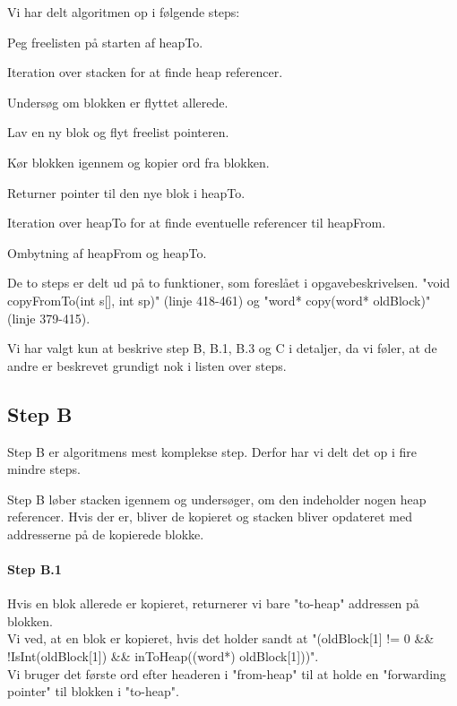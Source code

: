 Vi har delt algoritmen op i følgende steps:
\begin{my_description}
\item[Step A] Peg freelisten på starten af heapTo.
\item[Step B] Iteration over stacken for at finde heap referencer.
	\begin{my_description}
	\item[Step B.1] Undersøg om blokken er flyttet allerede.
	\item[Step B.2] Lav en ny blok og flyt freelist pointeren.
	\item[Step B.3] Kør blokken igennem og kopier ord fra blokken.
	\item[Step B.4] Returner pointer til den nye blok i heapTo.
	\end{my_description}
\item[Step C] Iteration over heapTo for at finde eventuelle referencer til heapFrom.
\item[Step D] Ombytning af heapFrom og heapTo.
\end{my_description}

De to steps er delt ud på to funktioner, som foreslået i opgavebeskrivelsen. "void copyFromTo(int s[], int sp)" (linje 418-461) og "word* copy(word* oldBlock)" (linje 379-415).

Vi har valgt kun at beskrive step B, B.1, B.3 og C i detaljer, da vi føler, at de andre er beskrevet grundigt nok i listen over steps.
\subsection{Step B}
Step B er algoritmens mest komplekse step. Derfor har vi delt det op i fire mindre steps.

Step B løber stacken igennem og undersøger, om den indeholder nogen heap referencer. Hvis der er, bliver de kopieret og stacken bliver opdateret med addresserne på de kopierede blokke.
\paragraph{Step B.1}
Hvis en blok allerede er kopieret, returnerer vi bare "to-heap" addressen på blokken. 
\\Vi ved, at en blok er kopieret, hvis det holder sandt at "(oldBlock[1] != 0 \&\& !IsInt(oldBlock[1]) \&\& inToHeap((word*) oldBlock[1]))". 
\\Vi bruger det første ord efter headeren i "from-heap" til at holde en "forwarding pointer" til blokken i "to-heap".
